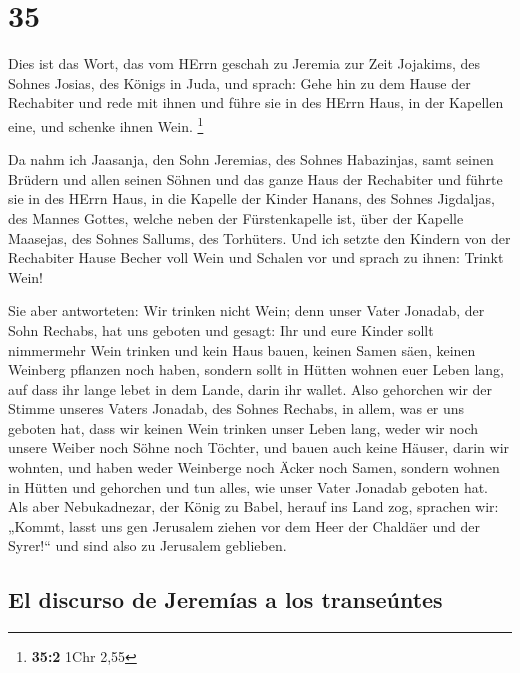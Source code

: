 \hypertarget{section-34}{%
\section{35}\label{section-34}}

 Dies ist das Wort, das vom HErrn geschah zu Jeremia zur
Zeit Jojakims, des Sohnes Josias, des Königs in Juda, und sprach:
 Gehe hin zu dem Hause der Rechabiter und rede mit ihnen
und führe sie in des HErrn Haus, in der Kapellen eine, und schenke ihnen
Wein. \footnote{\textbf{35:2} 1Chr 2,55}

 Da nahm ich Jaasanja, den Sohn Jeremias, des Sohnes
Habazinjas, samt seinen Brüdern und allen seinen Söhnen und das ganze
Haus der Rechabiter  und führte sie in des HErrn Haus, in
die Kapelle der Kinder Hanans, des Sohnes Jigdaljas, des Mannes Gottes,
welche neben der Fürstenkapelle ist, über der Kapelle Maasejas, des
Sohnes Sallums, des Torhüters.  Und ich setzte den Kindern
von der Rechabiter Hause Becher voll Wein und Schalen vor und sprach zu
ihnen: Trinkt Wein!

 Sie aber antworteten: Wir trinken nicht Wein; denn unser
Vater Jonadab, der Sohn Rechabs, hat uns geboten und gesagt: Ihr und
eure Kinder sollt nimmermehr Wein trinken  und kein Haus
bauen, keinen Samen säen, keinen Weinberg pflanzen noch haben, sondern
sollt in Hütten wohnen euer Leben lang, auf dass ihr lange lebet in dem
Lande, darin ihr wallet.  Also gehorchen wir der Stimme
unseres Vaters Jonadab, des Sohnes Rechabs, in allem, was er uns geboten
hat, dass wir keinen Wein trinken unser Leben lang, weder wir noch
unsere Weiber noch Söhne noch Töchter,  und bauen auch
keine Häuser, darin wir wohnten, und haben weder Weinberge noch Äcker
noch Samen,  sondern wohnen in Hütten und gehorchen und
tun alles, wie unser Vater Jonadab geboten hat.  Als aber
Nebukadnezar, der König zu Babel, herauf ins Land zog, sprachen wir:
„Kommt, lasst uns gen Jerusalem ziehen vor dem Heer der Chaldäer und der
Syrer!{}`` und sind also zu Jerusalem geblieben.

\hypertarget{el-discurso-de-jeremuxedas-a-los-transeuxfantes}{%
\subsection{El discurso de Jeremías a los
transeúntes}\label{el-discurso-de-jeremuxedas-a-los-transeuxfantes}}

